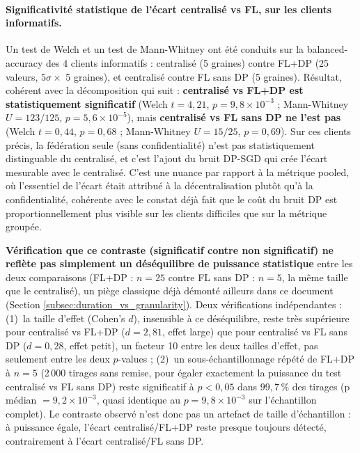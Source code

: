 \documentclass{article}
\begin{document}
\paragraph{Significativité statistique de l'écart centralisé vs FL, sur les clients
informatifs.} Un test de Welch et un test de Mann-Whitney ont été conduits sur la
balanced-accuracy des 4 clients informatifs : centralisé (5 graines) contre FL+DP
(25 valeurs, $5\sigma \times$ 5 graines), et centralisé contre FL sans DP (5 graines).
Résultat, cohérent avec la décomposition qui suit : \textbf{centralisé vs FL+DP est
statistiquement significatif} (Welch $t=4{,}21$, $p=9{,}8\times10^{-3}$ ; Mann-Whitney
$U=123/125$, $p=5{,}6\times10^{-5}$), mais \textbf{centralisé vs FL sans DP ne l'est
pas} (Welch $t=0{,}44$, $p=0{,}68$ ; Mann-Whitney $U=15/25$, $p=0{,}69$). Sur ces
clients précis, la fédération seule (sans confidentialité) n'est pas statistiquement
distinguable du centralisé, et c'est l'ajout du bruit DP-SGD qui crée l'écart mesurable
avec le centralisé. C'est une nuance par rapport à la métrique pooled, où l'essentiel de
l'écart était attribué à la décentralisation plutôt qu'à la confidentialité, cohérente
avec le constat déjà fait que le coût du bruit DP est proportionnellement plus visible
sur les clients difficiles que sur la métrique groupée.

\textbf{Vérification que ce contraste (significatif contre non significatif) ne
reflète pas simplement un déséquilibre de puissance statistique} entre les deux
comparaisons (FL+DP : $n=25$ contre FL sans DP : $n=5$, la même taille que le
centralisé), un piège classique déjà démonté ailleurs dans ce document (Section
\ref{subsec:duration_vs_granularity}). Deux vérifications indépendantes : (1)~la
taille d'effet (Cohen's $d$), insensible à ce déséquilibre, reste très supérieure pour
centralisé vs FL+DP ($d=2{,}81$, effet large) que pour centralisé vs FL sans DP
($d=0{,}28$, effet petit), un facteur 10 entre les deux tailles d'effet, pas
seulement entre les deux $p$-values ; (2)~un sous-échantillonnage répété de FL+DP à
$n=5$ (2\,000 tirages sans remise, pour égaler exactement la puissance du test
centralisé vs FL sans DP) reste significatif à $p<0{,}05$ dans $99{,}7\,\%$ des tirages
(p médian $=9{,}2\times10^{-3}$, quasi identique au $p=9{,}8\times10^{-3}$ sur
l'échantillon complet). Le contraste observé n'est donc pas un artefact de taille
d'échantillon : à puissance égale, l'écart centralisé/FL+DP reste presque toujours
détecté, contrairement à l'écart centralisé/FL sans DP.
\end{document}
